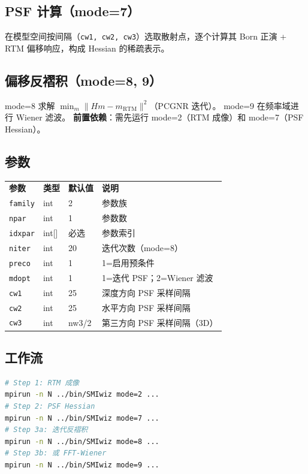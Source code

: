 \documentclass[11pt,a4paper]{ctexart}
\begin{document}
\subsection{PSF 计算（mode=7）}

在模型空间按间隔（\texttt{cw1, cw2, cw3}）选取散射点，逐个计算其 Born 正演 + RTM 偏移响应，构成 Hessian 的稀疏表示。

\subsection{偏移反褶积（mode=8, 9）}

mode=8 求解 $\min_m \| H m - m_{\text{RTM}} \|^2$（PCGNR 迭代）。
mode=9 在频率域进行 Wiener 滤波。
\textbf{前置依赖}：需先运行 mode=2（RTM 成像）和 mode=7（PSF Hessian）。

\subsection{参数}

\begin{tabular}{lllp{5cm}}
\textbf{参数} & \textbf{类型} & \textbf{默认值} & \textbf{说明} \\
\texttt{family} & int & 2 & 参数族 \\
\texttt{npar}   & int & 1 & 参数数 \\
\texttt{idxpar} & int[] & 必选 & 参数索引 \\
\texttt{niter}  & int & 20 & 迭代次数（mode=8）\\
\texttt{preco}  & int & 1  & 1=启用预条件 \\
\texttt{mdopt}  & int & 1  & 1=迭代 PSF；2=Wiener 滤波 \\
\texttt{cw1}    & int & 25 & 深度方向 PSF 采样间隔 \\
\texttt{cw2}    & int & 25 & 水平方向 PSF 采样间隔 \\
\texttt{cw3}    & int & nw3/2 & 第三方向 PSF 采样间隔（3D）\\
\end{tabular}

\subsection{工作流}

\begin{lstlisting}[language=bash]
# Step 1: RTM 成像
mpirun -n N ../bin/SMIwiz mode=2 ...
# Step 2: PSF Hessian
mpirun -n N ../bin/SMIwiz mode=7 ...
# Step 3a: 迭代反褶积
mpirun -n N ../bin/SMIwiz mode=8 ...
# Step 3b: 或 FFT-Wiener
mpirun -n N ../bin/SMIwiz mode=9 ...
\end{lstlisting}
\end{document}
